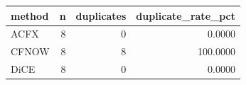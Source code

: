 \begin{tabular}{lrrr}
\toprule
method &  n &  duplicates &  duplicate\_rate\_pct \\
\midrule
  ACFX &  8 &           0 &              0.0000 \\
 CFNOW &  8 &           8 &            100.0000 \\
  DiCE &  8 &           0 &              0.0000 \\
\bottomrule
\end{tabular}

